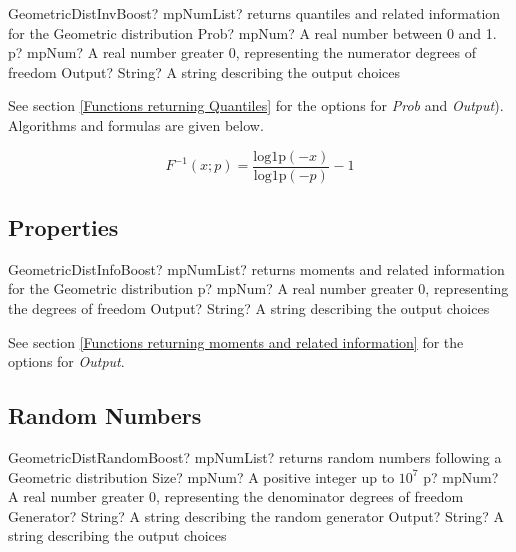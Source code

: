 \begin{mpFunctionsExtract}
	\mpFunctionThree
	{GeometricDistInvBoost? mpNumList? returns quantiles and related information for the Geometric distribution}
	{Prob? mpNum? A real number between 0 and 1.}
	{p? mpNum? A real number greater 0, representing the numerator  degrees of freedom}
	{Output? String? A string describing the output choices}
\end{mpFunctionsExtract}

See section \ref{Functions returning Quantiles} for the options for  {\itshape\sffamily Prob} and {\itshape\sffamily Output}). Algorithms and formulas are given below.

\begin{equation} 
	F^{-1}(x;p)= \frac{\text{log1p}(-x)}{\text{log1p}(-p)} -1
\end{equation}



\subsection{Properties}
\label{GeometricDistributionProperties}


\begin{mpFunctionsExtract}
	\mpFunctionTwo
	{GeometricDistInfoBoost? mpNumList? returns moments and related information for the Geometric distribution}
	{p? mpNum? A real number greater 0, representing the degrees of freedom}
	{Output? String? A string describing the output choices}
\end{mpFunctionsExtract}

\vspace{0.3cm}

See section \ref{Functions returning moments and related information} for the options for {\itshape\sffamily Output}. 




\subsection{Random Numbers}
\begin{mpFunctionsExtract}
	\mpFunctionFour
	{GeometricDistRandomBoost? mpNumList? returns random numbers following a Geometric distribution}
	{Size? mpNum? A positive integer up to $10^7$}
	{p? mpNum? A real number greater 0, representing the denominator degrees of freedom}
	{Generator? String? A string describing the random generator}
	{Output? String? A string describing the output choices}
\end{mpFunctionsExtract}

